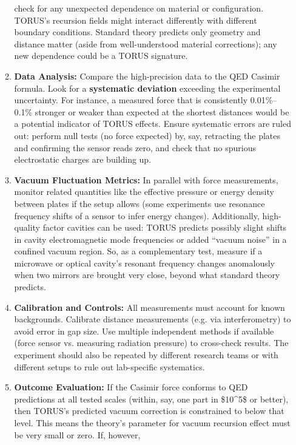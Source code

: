 \begin{itemize}
\begin{enumerate}
    check for any unexpected dependence on material or configuration.
    TORUS's recursion fields might interact differently with different
    boundary conditions​. Standard theory predicts only geometry and
    distance matter (aside from well-understood material corrections);
    any new dependence could be a TORUS signature.
  \item
    \textbf{Data Analysis:} Compare the high-precision data to the QED
    Casimir formula. Look for a \textbf{systematic deviation} exceeding
    the experimental uncertainty. For instance, a measured force that is
    consistently 0.01\%--0.1\% stronger or weaker than expected at the
    shortest distances would be a potential indicator of TORUS effects​.
    Ensure systematic errors are ruled out: perform null tests (no force
    expected) by, say, retracting the plates and confirming the sensor
    reads zero, and check that no spurious electrostatic charges are
    building up.
  \item
    \textbf{Vacuum Fluctuation Metrics:} In parallel with force
    measurements, monitor related quantities like the effective pressure
    or energy density between plates if the setup allows (some
    experiments use resonance frequency shifts of a sensor to infer
    energy changes). Additionally, high-quality factor cavities can be
    used: TORUS predicts possibly slight shifts in cavity
    electromagnetic mode frequencies or added ``vacuum noise'' in a
    confined vacuum region​. So, as a complementary test, measure if a
    microwave or optical cavity's resonant frequency changes anomalously
    when two mirrors are brought very close, beyond what standard theory
    predicts.
  \item
    \textbf{Calibration and Controls:} All measurements must account for
    known backgrounds. Calibrate distance measurements (e.g. via
    interferometry) to avoid error in gap size. Use multiple independent
    methods if available (force sensor vs. measuring radiation pressure)
    to cross-check results. The experiment should also be repeated by
    different research teams or with different setups to rule out
    lab-specific systematics.
  \item
    \textbf{Outcome Evaluation:} If the Casimir force conforms to QED
    predictions at all tested scales (within, say, one part in
    \$10\^{}5\$ or better), then TORUS's predicted vacuum correction is
    constrained to below that level​. This means the theory's parameter
    for vacuum recursion effect must be very small or zero. If, however,

\end{enumerate}
\end{itemize}
